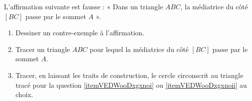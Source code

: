 
\begin{exercice}\label{exo2smath-0005}

    L'affirmation suivante est fausse : « Dans un triangle \( ABC\), la médiatrice du côté \( [BC]\) passe par le sommet \( A\) ».
    \begin{enumerate}
        \item   \label{itemVEDWooDxgxnoi}
            Dessiner un contre-exemple à l'affirmation.
        \item   \label{itemVEDWooDxgxnoii}
            Tracer un triangle \( ABC\) pour lequel la médiatrice du côté \( [BC]\) passe par le sommet \( A\).
        \item
            Tracer, en laissant les traits de construction, le cercle circonscrit au triangle tracé pour la question \ref{itemVEDWooDxgxnoi} ou \ref{itemVEDWooDxgxnoii} au choix.
    \end{enumerate}

\end{exercice}
